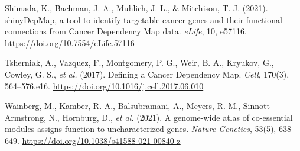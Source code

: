 \documentclass[11pt,a4paper]{article}
\begin{document}
\begin{list}{}{\setlength{\leftmargin}{1.5em}\setlength{\itemindent}{-1.5em}\setlength{\itemsep}{0.35em}\setlength{\parsep}{0pt}}
\item Shimada, K., Bachman, J. A., Muhlich, J. L., \& Mitchison, T. J. (2021). shinyDepMap, a tool to identify targetable cancer genes and their functional connections from Cancer Dependency Map data. \textit{eLife}, 10, e57116. \url{https://doi.org/10.7554/eLife.57116}
\item Tsherniak, A., Vazquez, F., Montgomery, P. G., Weir, B. A., Kryukov, G., Cowley, G. S., \textit{et al.} (2017). Defining a Cancer Dependency Map. \textit{Cell}, 170(3), 564--576.e16. \url{https://doi.org/10.1016/j.cell.2017.06.010}
\item Wainberg, M., Kamber, R. A., Balsubramani, A., Meyers, R. M., Sinnott-Armstrong, N., Hornburg, D., \textit{et al.} (2021). A genome-wide atlas of co-essential modules assigns function to uncharacterized genes. \textit{Nature Genetics}, 53(5), 638--649. \url{https://doi.org/10.1038/s41588-021-00840-z}
\end{list}
\end{document}
